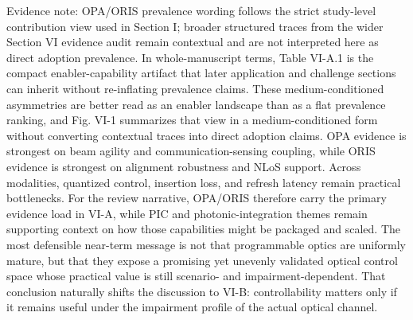 {}Evidence note: OPA/ORIS prevalence wording follows the strict study-level contribution view used in Section I; broader structured traces from the wider Section VI evidence audit remain contextual and are not interpreted here as direct adoption prevalence. In whole-manuscript terms, Table VI-A.1 is the compact enabler-capability artifact that later application and challenge sections can inherit without re-inflating prevalence claims.\markdownRendererParagraphSeparator
{}These medium-conditioned asymmetries are better read as an enabler landscape than as a flat prevalence ranking, and Fig. VI-1 summarizes that view in a medium-conditioned form without converting contextual traces into direct adoption claims.\markdownRendererParagraphSeparator
{}\markdownRendererParagraphSeparator
{} OPA evidence is strongest on beam agility and communication-sensing coupling, while ORIS evidence is strongest on alignment robustness and NLoS support. Across modalities, quantized control, insertion loss, and refresh latency remain practical bottlenecks. For the review narrative, OPA/ORIS therefore carry the primary evidence load in VI-A, while PIC and photonic-integration themes remain supporting context on how those capabilities might be packaged and scaled. The most defensible near-term message is not that programmable optics are uniformly mature, but that they expose a promising yet unevenly validated optical control space whose practical value is still scenario- and impairment-dependent. That conclusion naturally shifts the discussion to VI-B: controllability matters only if it remains useful under the impairment profile of the actual optical channel.\markdownRendererInterblockSeparator
{}
\markdownRendererSectionEnd \markdownRendererSectionBegin
{}\markdownRendererInterblockSeparator
